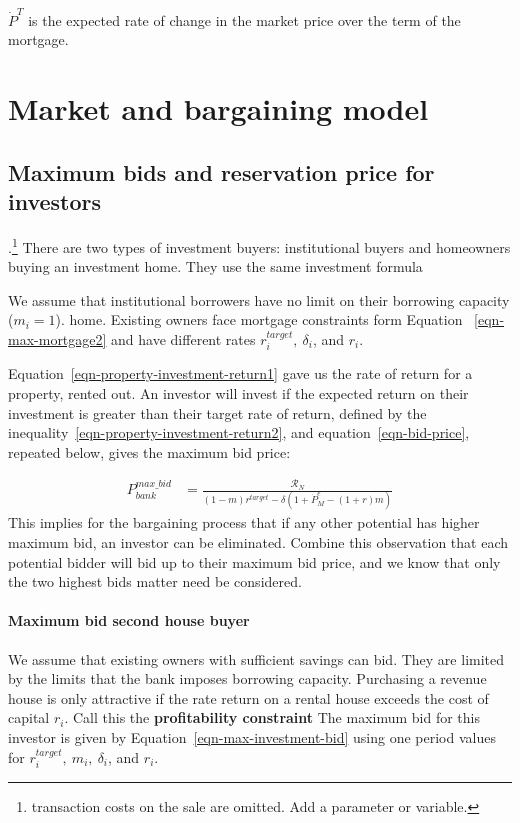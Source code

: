 $\dot P^T$  is the expected rate of change in the market price over the term of the mortgage.

\chapter{Market and bargaining model}
\section{Maximum bids and reservation price for investors }.\footnote{transaction costs on the sale are omitted. Add a parameter or variable.}
There are two types of investment buyers: institutional buyers and homeowners buying an investment home. They use the same investment formula

We assume that institutional borrowers have no limit on their borrowing capacity ($m_i=1$). home. Existing owners face mortgage constraints form Equation ~\ref{eqn-max-mortgage2} and have different rates $r_i^{target},\ \delta_i$, and $r_i$.

Equation~\ref{eqn-property-investment-return1} gave us the rate of return for a property, rented out. An investor will invest if the expected return on their investment is greater than their target rate of return, %
defined by the inequality~\ref{eqn-property-investment-return2}, and equation~\ref{eqn-bid-price}, repeated below, gives the maximum bid price:

\begin{eqnarray}\label{eqn-max-investment-bid}
P_{bank}^{max\_bid} & = \frac{\mathcal{R}_N}{(1-m)r^{target}-\delta \left(1 + \dot P_M^e - (1+r)m\right)} 
\end{eqnarray}
This implies for the bargaining process that if any other potential  has  higher maximum bid, an investor can be eliminated. Combine this observation that each potential bidder will bid up to their maximum bid price, and we know that only the two highest bids matter need be considered.  



\subsubsection{Maximum bid second house buyer}

We assume that existing owners with sufficient savings can bid. They are limited by the limits  that the bank imposes  borrowing capacity.   Purchasing a revenue house is only attractive if the rate return on a rental house exceeds the cost of capital $r_i$. Call this the \textbf{profitability constraint} The maximum bid for this investor is given by Equation~\ref{eqn-max-investment-bid} using one period values for $r_i^{target},\ m_i,\ \delta_i$, and $r_i$.

